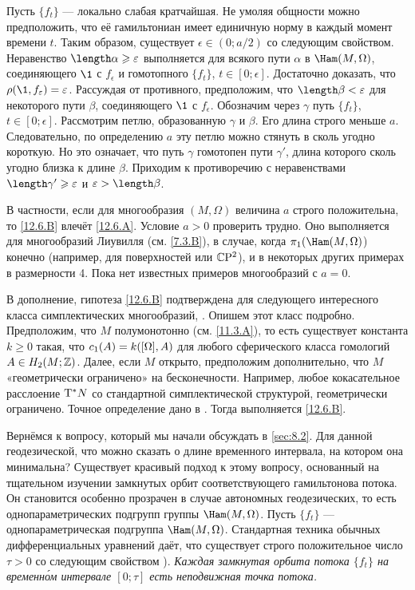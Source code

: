 Пусть $\{f_t\}$ — локально слабая кратчайшая.
Не умоляя общности можно предположить, что её гамильтониан имеет единичную норму в каждый момент времени $t$.
Таким образом, существует $\epsilon \in (0; a/2)$ со следующим свойством.
Неравенство $\length\alpha \ge \epsilon$ выполняется для всякого пути $\alpha$ в $\Ham(M, \Omega)$, соединяющего $\1$ с $f_\epsilon$ и гомотопного $\{f_t\}$, $t\in[0; \epsilon]$.
Достаточно доказать, что $\rho(\1, f_\epsilon) = \epsilon$.
Рассуждая от противного, предположим, что $\length \beta < \epsilon$ для некоторого пути $\beta$, соединяющего $\1$ с $f_\epsilon$.
Обозначим через $\gamma$ путь $\{f_t\}$, $t\in[0; \epsilon]$.
Рассмотрим петлю, образованную $\gamma$ и $\beta$.
Его длина строго меньше $a$.
Следовательно, по определению $a$ эту петлю можно стянуть в сколь угодно короткую.
Но это означает, что путь $\gamma$ гомотопен пути $\gamma'$, длина которого сколь угодно близка к длине $\beta$.
Приходим к противоречию с неравенствами $\length \gamma' \ge\epsilon$ и $\epsilon > \length \beta$.
\qeds

В частности, если для многообразия $(M,\Omega)$ величина $a$ строго положительна, то \ref{12.6.B} влечёт \ref{12.6.A}. 
Условие $a > 0$ проверить трудно. 
Оно выполняется для многообразий Лиувилля (см. \ref{7.3.B}), в случае, когда $\pi_1(\Ham(M, \Omega)$) конечно (например, для поверхностей или $\mathbb{C}\mathrm{P}^2$), и в некоторых других примерах в размерности 4. 
Пока нет известных примеров многообразий с $a = 0$. 

В дополнение, гипотеза \ref{12.6.B} подтверждена для следующего интересного класса  симплектических многообразий, \cite{LM2}.
Опишем этот класс подробно. 
Предположим, что $M$ полумонотонно (см. \ref{11.3.A}), то есть существует константа $k \ge 0$ такая, что $c_1(A) \z= k([\Omega],A)$ для любого сферического класса гомологий $A \in H_2 (M;\mathbb{Z})$. 
Далее, если $M$ открыто, предположим дополнительно, что $M$ «геометрически ограничено» на бесконечности. 
Например, любое кокасательное расслоение $\mathrm{T}^\ast N$ со стандартной симплектической структурой, геометрически ограничено.
Точное определение дано в \cite{AL}.
Тогда выполняется \ref{12.6.B}.

Вернёмся к вопросу, который мы начали обсуждать в \ref{sec:8.2}.
Для данной геодезической, что можно сказать о длине временного интервала, на котором она минимальна? 
Существует красивый подход к этому вопросу, основанный на тщательном изучении замкнутых орбит соответствующего гамильтонова потока. 
Он становится особенно прозрачен в случае автономных геодезических, то есть однопараметрических подгрупп группы $\Ham(M, \Omega)$. 
Пусть $\{f_t\}$ — однопараметрическая подгруппа $\Ham(M, \Omega)$.
Стандартная техника обычных дифференциальных уравнений даёт, что существует строго положительное число $\tau > 0$ со следующим свойством \cite[Sec. 5.7]{HZ}). 
\emph{Каждая замкнутая орбита потока $\{f_t\}$ на временн\'{о}м интервале $[0; \tau]$ есть неподвижная точка потока.} 

